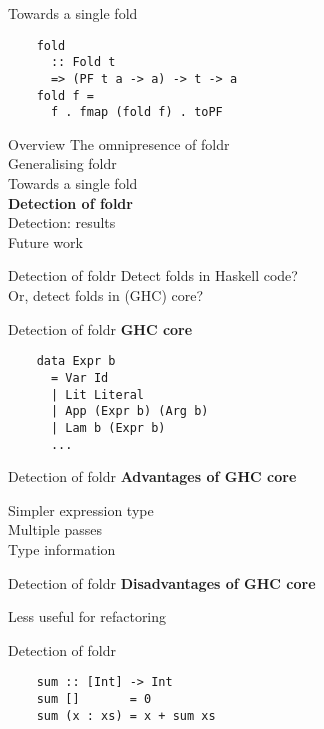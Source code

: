 \documentclass[20pt]{beamer}
\newcommand{\vspaced}{
    \vspace{5mm}
}
\begin{document}
\begin{frame}[fragile]{Towards a single fold}
    \begin{lstlisting}
    fold
      :: Fold t
      => (PF t a -> a) -> t -> a
    fold f =
      f . fmap (fold f) . toPF
    \end{lstlisting}
\end{frame}


\begin{frame}{Overview}
    The omnipresence of foldr \\
    Generalising foldr \\
    Towards a single fold \\
    \textbf{Detection of foldr} \\
    Detection: results \\
    Future work \\
\end{frame}

\begin{frame}{Detection of foldr}
    Detect folds in Haskell code? \\
    Or, detect folds in (GHC) core?
\end{frame}

\begin{frame}[fragile]{Detection of foldr}
    \textbf{GHC core} \\
    \vspaced
    \begin{lstlisting}
    data Expr b
      = Var Id
      | Lit Literal
      | App (Expr b) (Arg b)
      | Lam b (Expr b)
      ...
    \end{lstlisting}
\end{frame}

\begin{frame}[fragile]{Detection of foldr}
    \textbf{Advantages of GHC core} \\
    \vspaced
    Simpler expression type \\
    Multiple passes \\
    Type information \\
\end{frame}

\begin{frame}[fragile]{Detection of foldr}
    \textbf{Disadvantages of GHC core} \\
    \vspaced
    Less useful for refactoring
\end{frame}

\begin{frame}[fragile]{Detection of foldr}
    \begin{lstlisting}
    sum :: [Int] -> Int
    sum []       = 0
    sum (x : xs) = x + sum xs
    \end{lstlisting}
\end{frame}
\end{document}
